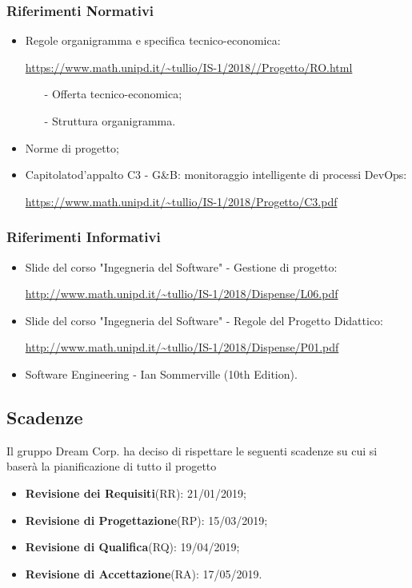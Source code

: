 			\subsubsection{Riferimenti Normativi}
				\begin{itemize}
					\item Regole organigramma e specifica tecnico-economica:

					\url{https://www.math.unipd.it/~tullio/IS-1/2018//Progetto/RO.html}
						\begin{itemize}
							\item[-] Offerta tecnico-economica;
							\item[-]Struttura organigramma.
						\end{itemize}
					\item Norme di progetto;
					\item Capitolato\pedice d'appalto C3 - G\&B: monitoraggio intelligente di processi DevOps\pedice:
					
					\url{https://www.math.unipd.it/~tullio/IS-1/2018/Progetto/C3.pdf}
				\end{itemize}
				
			\subsubsection{Riferimenti Informativi}
				\begin{itemize}
					\item Slide del corso "Ingegneria del Software" - Gestione di progetto:
					
					\url{http://www.math.unipd.it/~tullio/IS-1/2018/Dispense/L06.pdf}
					\item Slide del corso "Ingegneria del Software" - Regole del Progetto Didattico:

					\url{http://www.math.unipd.it/~tullio/IS-1/2018/Dispense/P01.pdf}

					\item Software Engineering - Ian Sommerville (10th Edition).
				\end{itemize}

		\subsection{Scadenze}
			Il gruppo Dream Corp. ha deciso di rispettare le seguenti scadenze su cui si baserà la pianificazione di tutto il progetto
			\begin{itemize}
				\item \textbf{Revisione dei Requisiti}(RR): 21/01/2019;
				\item \textbf{Revisione di Progettazione}(RP): 15/03/2019;
				\item \textbf{Revisione di Qualifica}(RQ): 19/04/2019;
				\item \textbf{Revisione di Accettazione}(RA): 17/05/2019.
			\end{itemize}



	\newpage